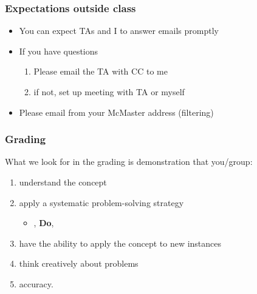 \begin{frame}\frametitle{Expectations outside class}
	\begin{itemize}
		\item	You can expect TAs and I to answer emails promptly
		\item	If you have questions
			\begin{enumerate}
				\item	Please email the TA with CC to me \hfill {\tiny{\color{myOrange}{$\longleftarrow$ hopefully this solves your problem}}}
				\item	if not, set up meeting with TA or myself
			\end{enumerate}
		\item	Please email from your McMaster address (filtering)
	\end{itemize}
\end{frame}

\begin{frame}\frametitle{Grading}
	What we look for in the grading is demonstration that you/group:
	\begin{enumerate}
		\item	understand the concept
		\item	apply a systematic problem-solving strategy
		\begin{itemize}
			
			\item	\texttt{{\color{purple}{Define, Explore, Plan}}}, \textbf{Do}, \texttt{{\color{myOrange}{Check, Generalize}}}
		\end{itemize}
		\item	have the ability to apply the concept to new instances
		\item	think creatively about problems
		\item	accuracy.
	\end{enumerate}
\end{frame}

